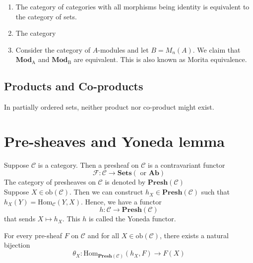 \documentclass[oneside, 12pt, ]{scrbook}
\theoremstyle{theorem}
\begin{document}
\begin{example}
\begin{enumerate}
\item The category of categories with all morphisms being identity is equivalent to the category of sets.
\item The category 
\item Consider the category of $A$-modules and let $B = M_{n}(A)$. We claim that $\mathrm{\textbf{Mod}_{A}}$ and $\mathrm{\textbf{Mod}_{B}}$ are equivalent. This is also known as Morita equivalence.
\end{enumerate}
\end{example}

\subsection{Products and Co-products}


In partially ordered sets, neither product nor co-product might exist. \\

\section{Pre-sheaves and Yoneda lemma}

Suppose $\mathcal{C}$ is a category. Then a presheaf on $\mathcal{C}$ is a contravariant functor $$\mathcal{F} : \mathcal{C} \rightarrow \mathbf{Sets} ( \text{ or }\mathbf{Ab})$$
The category of presheaves on $\mathcal{C}$ is denoted by $\mathbf{Presh(\mathcal{C})}$\\

Suppose $X \in \mathrm{ob}(\mathcal{C})$. Then we can construct $h_{X} \in \mathbf{Presh}(\mathcal{C})$ such that $h_{X}(Y) = \mathrm{Hom}_{\mathcal{C}}(Y,X)$. Hence, we have a functor $$h : \mathcal{C} \rightarrow \mathbf{Presh}(\mathcal{C})$$ that sends $X \mapsto h_{X}$. This $h$ is called the Yoneda functor. 

\begin{lemma}
For every pre-sheaf $F$ on $\mathcal{C}$ and for all $X \in \mathrm{ob}(\mathcal{C})$, there exists a natural bijection $$\theta_{X}: \mathrm{Hom}_{\mathbf{Presh}(\mathcal{C})}(h_{X}, F) \rightarrow F(X)$$
\end{lemma}
\end{document}

